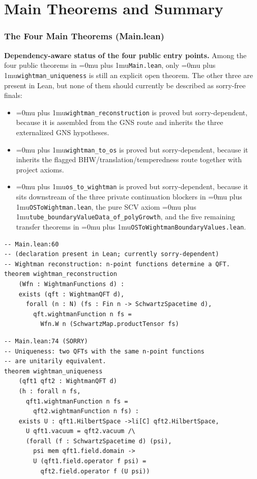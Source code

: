 \documentclass[11pt,a4paper]{article}
\newcommand{\leanfile}[1]{\begingroup\Urlmuskip=0mu plus 1mu\relax\nolinkurl{#1}\endgroup}
\newcommand{\leanname}[1]{\begingroup\Urlmuskip=0mu plus 1mu\relax\nolinkurl{#1}\endgroup}
\begin{document}
\part{Main Theorems and Summary}

\section{The Four Main Theorems (Main.lean)}

\noindent
\textbf{Dependency-aware status of the four public entry points.}
Among the four public theorems in \leanfile{Main.lean}, only
\leanname{wightman\_uniqueness} is still an explicit open theorem. The other
three are present in Lean, but none of them should currently be described as
sorry-free finals:
\begin{itemize}
\item \leanname{wightman\_reconstruction} is proved but sorry-dependent, because it
  is assembled from the GNS route and inherits the three externalized GNS
  hypotheses.
\item \leanname{wightman\_to\_os} is proved but sorry-dependent, because it inherits
  the flagged BHW/translation/temperedness route together with project axioms.
\item \leanname{os\_to\_wightman} is proved but sorry-dependent, because it sits
  downstream of the three private continuation blockers in
  \leanfile{OSToWightman.lean}, the pure SCV axiom
  \leanname{tube\_boundaryValueData\_of\_polyGrowth}, and the five remaining
  transfer theorems in \leanfile{OSToWightmanBoundaryValues.lean}.
\end{itemize}

\begin{lstlisting}
-- Main.lean:60
-- (declaration present in Lean; currently sorry-dependent)
-- Wightman reconstruction: n-point functions determine a QFT.
theorem wightman_reconstruction
    (Wfn : WightmanFunctions d) :
    exists (qft : WightmanQFT d),
      forall (n : N) (fs : Fin n -> SchwartzSpacetime d),
        qft.wightmanFunction n fs =
          Wfn.W n (SchwartzMap.productTensor fs)
\end{lstlisting}

\begin{lstlisting}[style=leansorry]
-- Main.lean:74 (SORRY)
-- Uniqueness: two QFTs with the same n-point functions
-- are unitarily equivalent.
theorem wightman_uniqueness
    (qft1 qft2 : WightmanQFT d)
    (h : forall n fs,
      qft1.wightmanFunction n fs =
        qft2.wightmanFunction n fs) :
    exists U : qft1.HilbertSpace ->li[C] qft2.HilbertSpace,
      U qft1.vacuum = qft2.vacuum /\
      (forall (f : SchwartzSpacetime d) (psi),
        psi mem qft1.field.domain ->
        U (qft1.field.operator f psi) =
          qft2.field.operator f (U psi))
\end{lstlisting}
\end{document}
